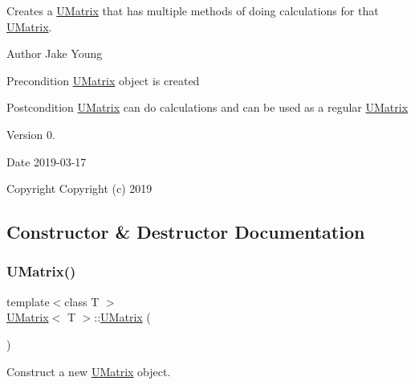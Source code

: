 Creates a \mbox{\hyperlink{class_u_matrix}{U\+Matrix}} that has multiple methods of doing calculations for that \mbox{\hyperlink{class_u_matrix}{U\+Matrix}}. 

\begin{DoxyAuthor}{Author}
Jake Young 
\end{DoxyAuthor}
\begin{DoxyPrecond}{Precondition}
\mbox{\hyperlink{class_u_matrix}{U\+Matrix}} object is created 
\end{DoxyPrecond}
\begin{DoxyPostcond}{Postcondition}
\mbox{\hyperlink{class_u_matrix}{U\+Matrix}} can do calculations and can be used as a regular \mbox{\hyperlink{class_u_matrix}{U\+Matrix}} 
\end{DoxyPostcond}
\begin{DoxyVersion}{Version}
0. 
\end{DoxyVersion}
\begin{DoxyDate}{Date}
2019-\/03-\/17
\end{DoxyDate}
\begin{DoxyCopyright}{Copyright}
Copyright (c) 2019 
\end{DoxyCopyright}


\subsection{Constructor \& Destructor Documentation}
\mbox{\label{class_u_matrix_a7c6cfdd2d26c56bca1f5b1d79e7f2ee2}} 
\subsubsection{\texorpdfstring{UMatrix()}{UMatrix()}\hspace{0.1cm}{\footnotesize\ttfamily [1/4]}}
{\footnotesize\ttfamily template$<$class T $>$ \\
\mbox{\hyperlink{class_u_matrix}{U\+Matrix}}$<$ T $>$\+::\mbox{\hyperlink{class_u_matrix}{U\+Matrix}} (\begin{DoxyParamCaption}{ }\end{DoxyParamCaption})}



Construct a new \mbox{\hyperlink{class_u_matrix}{U\+Matrix}} object. 

\mbox{\label{class_u_matrix_ad0d2d3e05ad904daed36504eddd25a2c}} 
